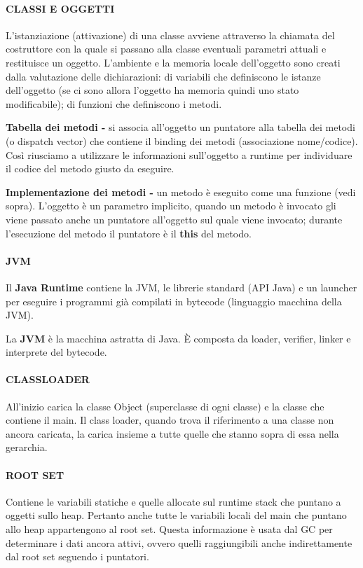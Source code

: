 \documentclass[a4paper, 12pt]{article}
\begin{document}
\paragraph{CLASSI E OGGETTI}
L'istanziazione (attivazione) di una classe avviene attraverso la chiamata del costruttore
con la quale si passano alla classe eventuali parametri attuali e restituisce un oggetto.
L'ambiente e la memoria locale dell'oggetto sono creati dalla valutazione delle
dichiarazioni: di variabili che definiscono le istanze dell'oggetto (se ci sono allora
l'oggetto ha memoria quindi uno stato modificabile); di funzioni che definiscono i metodi.

\textbf{Tabella dei metodi -} si associa all'oggetto un puntatore alla tabella dei metodi
(o dispatch vector) che contiene il binding dei metodi (associazione nome/codice). Così
riusciamo a utilizzare le informazioni sull'oggetto a runtime per individuare
il codice del metodo giusto da eseguire.

\textbf{Implementazione dei metodi -} un metodo è eseguito come una funzione (vedi sopra).
L'oggetto è un parametro implicito, quando un metodo è invocato gli viene passato anche un
puntatore all'oggetto sul quale viene invocato; durante l'esecuzione del metodo il puntatore
è il \textbf{this} del metodo.

\paragraph{JVM}
Il \textbf{Java Runtime} contiene la JVM, le librerie standard (API Java) e un launcher per
eseguire i programmi già compilati in bytecode (linguaggio macchina della JVM).

La \textbf{JVM} è la macchina astratta di Java. È composta da loader, verifier, linker e
interprete del bytecode.

\paragraph{CLASSLOADER}
All'inizio carica la classe Object (superclasse di ogni classe) e la classe che
contiene il main.
Il class loader, quando trova il riferimento a una classe non ancora caricata, la carica
insieme a tutte quelle che stanno sopra di essa nella gerarchia.

\paragraph{ROOT SET} 
Contiene le variabili statiche e quelle allocate sul runtime stack che puntano a oggetti
sullo heap. Pertanto anche tutte le variabili locali del main che puntano allo heap
appartengono al root set. Questa informazione è usata dal GC per determinare i dati ancora
attivi, ovvero quelli raggiungibili anche indirettamente dal root set seguendo i puntatori.
\end{document}
